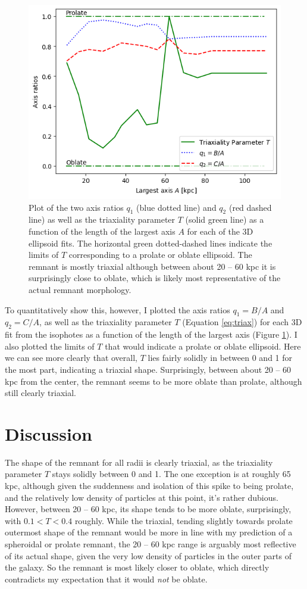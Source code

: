 \documentclass[twocolumn]{aastex631}
\begin{document}
\begin{figure}
    \centering
    \includegraphics[width=0.85\linewidth]{axis_ratios.png}
    \caption{Plot of the two axis ratios $q_1$ (blue dotted line) and $q_2$ (red dashed line) as well as the triaxiality parameter $T$ (solid green line) as a function of the length of the largest axis $A$ for each of the 3D ellipsoid fits. The horizontal green dotted-dashed lines indicate the limits of $T$ corresponding to a prolate or oblate ellipsoid. The remnant is mostly  triaxial although between about 20 -- 60 kpc it is surprisingly close to oblate, which is likely most representative of the actual remnant morphology.}
    \label{fig:axis_ratios}
\end{figure}
To quantitatively show this, however, I plotted the axis ratios $q_1 = B/A$ and $q_2 = C/A$, as well as the triaxiality parameter $T$ (Equation \ref{eq:triax}) for each 3D fit from the isophotes as a function of the length of the largest axis (Figure \ref{fig:axis_ratios}). 
I also plotted the limits of $T$ that would indicate a prolate or oblate ellipsoid.
Here we can see more clearly that overall, $T$ lies fairly solidly in between 0 and 1 for the most part, indicating a triaxial shape.
Surprisingly, between about 20 -- 60 kpc from the center, the remnant seems to be more oblate than prolate, although still clearly triaxial.


\section{Discussion}

The shape of the remnant for all radii is clearly triaxial, as the triaxiality parameter $T$ stays solidly between 0 and 1.
The one exception is at roughly 65 kpc, although given the suddenness and isolation of this spike to being prolate, and the relatively low density of particles at this point, it's rather dubious.
However, between 20 -- 60 kpc, its shape tends to be more oblate, surprisingly, with $0.1 < T < 0.4$ roughly. 
While the triaxial, tending slightly towards prolate outermost shape of the remnant would be more in line with my prediction of a spheroidal or prolate remnant, the 20 -- 60 kpc range is arguably most reflective of its actual shape, given the very low density of particles in the outer parts of the galaxy.
So the remnant is most likely closer to oblate, which directly contradicts my expectation that it would \textit{not} be oblate.
\end{document}

